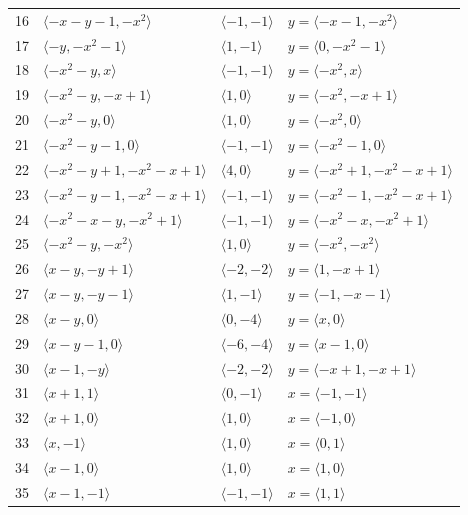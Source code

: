 \documentclass[11pt]{article}
\begin{document}
\begin{longtable}{@{}rlll@{}}
16 & $\langle -x-y-1,-x^{2}\rangle$ & $\langle -1,-1\rangle$ & $y=\langle -x-1,-x^{2}\rangle$\\
17 & $\langle -y,-x^{2}-1\rangle$ & $\langle 1,-1\rangle$ & $y=\langle 0,-x^{2}-1\rangle$\\
18 & $\langle -x^{2}-y,x\rangle$ & $\langle -1,-1\rangle$ & $y=\langle -x^{2},x\rangle$\\
19 & $\langle -x^{2}-y,-x+1\rangle$ & $\langle 1,0\rangle$ & $y=\langle -x^{2},-x+1\rangle$\\
20 & $\langle -x^{2}-y,0\rangle$ & $\langle 1,0\rangle$ & $y=\langle -x^{2},0\rangle$\\
21 & $\langle -x^{2}-y-1,0\rangle$ & $\langle -1,-1\rangle$ & $y=\langle -x^{2}-1,0\rangle$\\
22 & $\langle -x^{2}-y+1,-x^{2}-x+1\rangle$ & $\langle 4,0\rangle$ & $y=\langle -x^{2}+1,-x^{2}-x+1\rangle$\\
23 & $\langle -x^{2}-y-1,-x^{2}-x+1\rangle$ & $\langle -1,-1\rangle$ & $y=\langle -x^{2}-1,-x^{2}-x+1\rangle$\\
24 & $\langle -x^{2}-x-y,-x^{2}+1\rangle$ & $\langle -1,-1\rangle$ & $y=\langle -x^{2}-x,-x^{2}+1\rangle$\\
25 & $\langle -x^{2}-y,-x^{2}\rangle$ & $\langle 1,0\rangle$ & $y=\langle -x^{2},-x^{2}\rangle$\\
26 & $\langle x-y,-y+1\rangle$ & $\langle -2,-2\rangle$ & $y=\langle 1,-x+1\rangle$\\
27 & $\langle x-y,-y-1\rangle$ & $\langle 1,-1\rangle$ & $y=\langle -1,-x-1\rangle$\\
28 & $\langle x-y,0\rangle$ & $\langle 0,-4\rangle$ & $y=\langle x,0\rangle$\\
29 & $\langle x-y-1,0\rangle$ & $\langle -6,-4\rangle$ & $y=\langle x-1,0\rangle$\\
30 & $\langle x-1,-y\rangle$ & $\langle -2,-2\rangle$ & $y=\langle -x+1,-x+1\rangle$\\
31 & $\langle x+1,1\rangle$ & $\langle 0,-1\rangle$ & $x=\langle -1,-1\rangle$\\
32 & $\langle x+1,0\rangle$ & $\langle 1,0\rangle$ & $x=\langle -1,0\rangle$\\
33 & $\langle x,-1\rangle$ & $\langle 1,0\rangle$ & $x=\langle 0,1\rangle$\\
34 & $\langle x-1,0\rangle$ & $\langle 1,0\rangle$ & $x=\langle 1,0\rangle$\\
35 & $\langle x-1,-1\rangle$ & $\langle -1,-1\rangle$ & $x=\langle 1,1\rangle$\\

\end{longtable}
\end{document}
